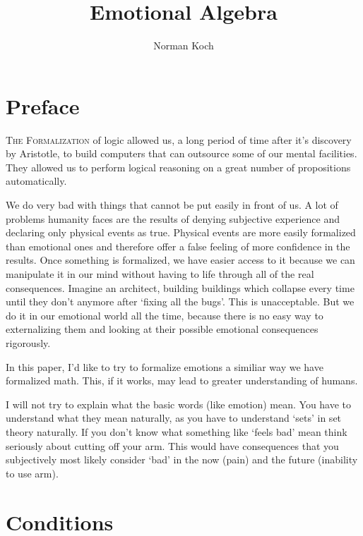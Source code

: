 \documentclass{scrartcl}
\begin{document}
\author{Norman Koch}
\title{Emotional Algebra}

\maketitle

\tableofcontents
\newpage

\section{Preface}

\lettrine[nindent=0em]{\color{purple}T}{he Formalization}
of logic allowed us, a long period of time after it's discovery by Aristotle, to build computers that can outsource some of our
mental facilities. They allowed us to perform logical reasoning on a great number of propositions automatically.

We do very bad with things that cannot be put easily in front of us. A lot of problems humanity faces are the results of
denying subjective experience and declaring only physical events as true. Physical events are more easily formalized than
emotional ones and therefore offer a false feeling of more confidence in the results. Once something is formalized, we have
easier access to it because we can manipulate it in our mind without having to life through all of the real consequences.
Imagine an architect, building buildings which collapse every time until they don't anymore after `fixing all the bugs'.
This is unacceptable. But we do it in our emotional world all the time, because there is no easy way to externalizing them
and looking at their possible emotional consequences rigorously.

In this paper, I'd like to try to formalize emotions a similiar way we have formalized math. This, if it works, may 
lead to greater understanding of humans.

I will not try to explain what the basic words (like emotion) mean. You have to understand what they mean naturally,
as you have to understand `sets' in set theory naturally. If you don't know what something like `feels bad' mean
think seriously about cutting off your arm. This would have consequences that you subjectively most likely consider
`bad' in the now (pain) and the future (inability to use arm).

\section{Conditions}
\end{document}
